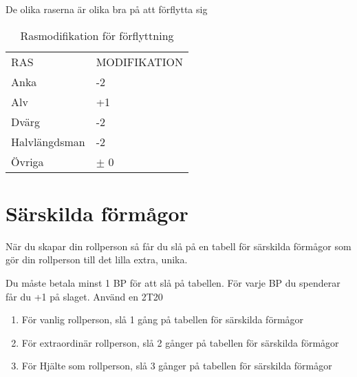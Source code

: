 \documentclass[a4paper, 10pt, titlepage]{article}
\begin{document}
De olika raserna är olika bra på att förflytta sig
\begin{table}[hbp]
  \caption{Rasmodifikation för förflyttning}
 \begin{tabular}{|l|l|}
   \hline
   RAS      & MODIFIKATION \\
   Anka     & -2 \\
   Alv      & +1 \\
   Dvärg    & -2 \\
   Halvlängdsman & -2 \\
   Övriga   & $\pm$ 0 \\
 \end{tabular}
\end{table}


\section{Särskilda förmågor}
När du skapar din rollperson så får du slå på en tabell för särskilda förmågor
som gör din rollperson till det lilla extra, unika.

Du måste betala minst 1 BP för att slå på tabellen. För varje BP du spenderar
får du +1 på slaget. Använd en 2T20

\begin{enumerate}[x]
  \item För vanlig rollperson, slå 1 gång på tabellen för särskilda förmågor
  \item För extraordinär rollperson, slå 2 gånger på tabellen för särskilda förmågor
  \item För Hjälte som rollperson, slå 3 gånger på tabellen för särskilda förmågor
\end{enumerate}
\end{document}
